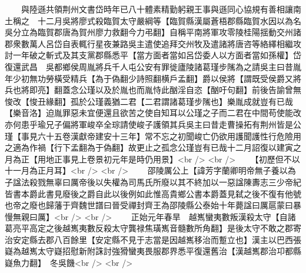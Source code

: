 　　與陸遜共領荆州文書岱時年已八十體素精勤躬親王事與遜同心協規有善相讓南土稱之　十二月吳將廖式殺臨賀太守嚴綱等【臨賀縣漢屬蒼梧郡縣臨賀水因以為名吳分立為臨賀郡唐為賀州廖力救翻今力弔翻】自稱平南將軍攻零陵桂陽揺動交州諸郡衆數萬人呂岱自表輒行星夜兼路吳主遣使追拜交州牧及遣諸將唐咨等絡繹相繼攻討一年破之斬式及其支黨郡縣悉平【當方面者當如呂岱委人以方面者當如孫權】岱復還武昌　吳都鄉侯周胤將兵千人屯公安有罪徙廬陵諸葛瑾步隲為之請吳主曰昔胤年少初無功勞橫受精兵【為于偽翻少詩照翻横戶孟翻】爵以侯將【謂既受侯爵又將兵也將即亮】翻蓋念公瑾以及於胤也而胤恃此酗淫自恣【酗吁句翻】前後告諭曾無悛改【悛丑緣翻】孤於公瑾義猶二君【二君謂諸葛瑾步隲也】樂胤成就豈有已哉【樂音洛】迫胤罪惡未宜便還且欲苦之使自知耳以公瑾之子而二君在中間苟使能改亦何患乎瑜兄子偏將軍峻卒全琮請使峻子護領其兵吳主曰昔走曹操拓有荆州皆是公瑾【事見六十五卷漢獻帝建安十三年】常不忘之初聞峻亡仍欲用護聞護性行危險用之適為作禍【行下孟翻為于偽翻】故更止之孤念公瑾豈有已哉十二月詔復以建寅之月為正【用地正事見上卷景初元年是時仍用景】<br />
<br />
　　【初歷但不以十一月為正月耳】<br />
<br />
　　邵陵厲公上【諱芳字蘭卿明帝無子養以為子諡法殺戮無辜曰厲帝後以失權為司馬氏所廢以其不終加以一惡諡陳夀志三少帝紀皆書本爵此書見廢後之爵自此以後例如此惟高貴鄉公書本爵蓋見弑之後不復有他號也帝之廢也歸藩于齊魏世譜曰晉受禪封齊王為邵陵縣公泰始十年薨諡曰厲扈蒙曰暴慢無親曰厲】<br />
<br />
　　正始元年春旱　越嶲蠻夷數叛漢殺太守【自諸葛亮平高定之後越嶲夷數反殺太守龔禄焦璜嶲音髓數所角翻】是後太守不敢之郡寄治安定縣去郡八百餘里【安定縣不見于志當是因越嶲移治而蹔立也】漢主以巴西張嶷為越嶲太守嶷招慰新附誅討強猾蠻夷畏服郡界悉平復還舊治【漢越嶲郡治卭都縣嶷魚力翻】　冬吳饑<br />
<br />
